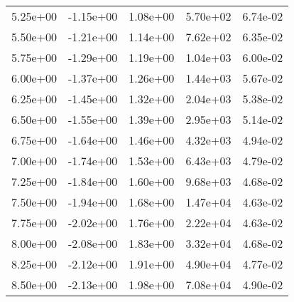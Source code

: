 \begin{tabular}{rrrrr}
5.25e+00 &         -1.15e+00 &              1.08e+00 &                     5.70e+02 &       6.74e-02 \\
5.50e+00 &         -1.21e+00 &              1.14e+00 &                     7.62e+02 &       6.35e-02 \\
5.75e+00 &         -1.29e+00 &              1.19e+00 &                     1.04e+03 &       6.00e-02 \\
6.00e+00 &         -1.37e+00 &              1.26e+00 &                     1.44e+03 &       5.67e-02 \\
6.25e+00 &         -1.45e+00 &              1.32e+00 &                     2.04e+03 &       5.38e-02 \\
6.50e+00 &         -1.55e+00 &              1.39e+00 &                     2.95e+03 &       5.14e-02 \\
6.75e+00 &         -1.64e+00 &              1.46e+00 &                     4.32e+03 &       4.94e-02 \\
7.00e+00 &         -1.74e+00 &              1.53e+00 &                     6.43e+03 &       4.79e-02 \\
7.25e+00 &         -1.84e+00 &              1.60e+00 &                     9.68e+03 &       4.68e-02 \\
7.50e+00 &         -1.94e+00 &              1.68e+00 &                     1.47e+04 &       4.63e-02 \\
7.75e+00 &         -2.02e+00 &              1.76e+00 &                     2.22e+04 &       4.63e-02 \\
8.00e+00 &         -2.08e+00 &              1.83e+00 &                     3.32e+04 &       4.68e-02 \\
8.25e+00 &         -2.12e+00 &              1.91e+00 &                     4.90e+04 &       4.77e-02 \\
8.50e+00 &         -2.13e+00 &              1.98e+00 &                     7.08e+04 &       4.90e-02 \\
\bottomrule
\end{tabular}
